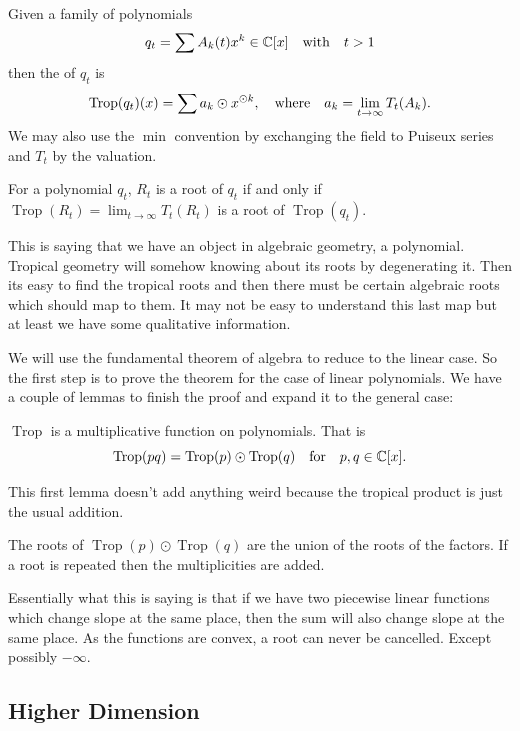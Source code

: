 \documentclass[12pt]{memoir}
\DeclareMathOperator{\Trop}{Trop}
\begin{document}
\begin{Def}
    Given a family of polynomials 
    $$q_t=\sum A_k(t)x^k\in\mathbb{C}[x]\quad\text{with}\quad t>1$$
    then the  of $q_t$ is 
    $$\Trop(q_t)(x)=\sum a_k\odot x^{\odot k},\word{where}a_k=\lim_{t\to\infty}T_t(A_k).$$
    We may also use the $\min$ convention by exchanging the field to Puiseux series and $T_t$ by the valuation.
\end{Def}

\begin{Th}[Correspondence]
For a polynomial $q_t$, $R_t$ is a root of $q_t$ if and only if $\Trop(R_t)=\lim_{t\to\infty}T_t(R_t)$ is a root of $\Trop(q_t)$.
\end{Th}

This is saying that we have an object in algebraic geometry, a polynomial. Tropical geometry will somehow knowing about its roots by degenerating it. Then its easy to find the tropical roots and then there must be certain algebraic roots which should map to them. It may not be easy to understand this last map but at least we have some qualitative information.\par 
We will use the fundamental theorem of algebra to reduce to the linear case. So the first step is to prove the theorem for the case of linear polynomials. We have a couple of lemmas to finish the proof and expand it to the general case:

\begin{Lem}
    $\Trop$ is a multiplicative function on polynomials. That is
    $$\Trop(pq)=\Trop(p)\odot\Trop(q)\word{for}p,q\in\bC[x].$$
    \end{Lem}
    
This first lemma doesn't add anything weird because the tropical product is just the usual addition.

    \begin{Lem}
    The roots of $\Trop(p)\odot\Trop(q)$ are the union of the roots of the factors. If a root is repeated then the multiplicities are added.
    \end{Lem}

    Essentially what this is saying is that if we have two piecewise linear functions which change slope at the same place, then the sum will also change slope at the same place. As the functions are convex, a root can never be cancelled. Except possibly $-\infty$.

    \subsection{Higher Dimension}
\end{document}
